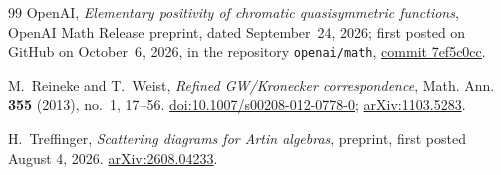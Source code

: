 \documentclass[11pt]{article}
\theoremstyle{definition}
\theoremstyle{remark}
\numberwithin{equation}{section}
\begin{document}
\begin{thebibliography}{99}
OpenAI,
\emph{Elementary positivity of chromatic quasisymmetric functions},
OpenAI Math Release preprint, dated September~24, 2026; first posted on
GitHub on October~6, 2026, in the repository \texttt{openai/math},
\href{https://github.com/openai/math/tree/7ef5c0cc5ca4b0e072b7a050fca09ab24bc6fa3a/preprints/Elementary-Positivity-of-Chromatic-Quasisymmetric-Functions-September-24-2026}{commit 7ef5c0cc}.

M.~Reineke and T.~Weist,
\emph{Refined GW/Kronecker correspondence},
Math. Ann. \textbf{355} (2013), no.~1, 17--56.
\href{https://doi.org/10.1007/s00208-012-0778-0}{doi:10.1007/s00208-012-0778-0};
\href{https://arxiv.org/abs/1103.5283}{arXiv:1103.5283}.

H.~Treffinger,
\emph{Scattering diagrams for Artin algebras},
preprint, first posted August 4, 2026.
\href{https://arxiv.org/abs/2608.04233}{arXiv:2608.04233}.

\end{thebibliography}
\end{document}
